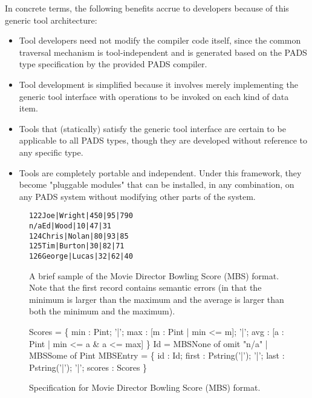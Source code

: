 In concrete terms, the following benefits accrue to developers because of this generic tool architecture:
\begin{itemize}
\item Tool developers need not modify the compiler code itself, since the common traversal mechanism is tool-independent and is generated based on the PADS type specification by the provided PADS compiler.
\item Tool development is simplified because it involves merely implementing the generic tool interface with operations to be invoked on each kind of data item.
\item Tools that (statically) satisfy the generic tool interface are certain to be applicable to all PADS types, though they are developed without reference to any specific type.
\item Tools are completely portable and independent. Under this framework, they become "pluggable modules" that can be installed, in any combination, on any PADS system without modifying other parts of the system.
\end{itemize}

\begin{figure}
  \centering
  \small
\begin{verbatim}
122Joe|Wright|450|95|790
n/aEd|Wood|10|47|31
124Chris|Nolan|80|93|85
125Tim|Burton|30|82|71
126George|Lucas|32|62|40
\end{verbatim}  
  \caption{A brief sample of the Movie Director Bowling Score (MBS) format. Note that the first record contains semantic errors (in that the minimum is larger than the maximum and the average is larger than both the minimum and the maximum).}
  \label{fig:gentool-mbs-sample}
\end{figure}

\begin{figure}
  \centering
  \begin{code}\scriptsize
{} Scores = \{
       min : Pint;
 '|';  max : [m : Pint | min <= m];
 '|';  avg : [a : Pint | min <= a & a <= max]
\}
\mbox{}
 Id =
       MBSNone of omit "n/a"
       | MBSSome of Pint
\mbox{}
 MBSEntry = \{
       id       : Id;
       first    : Pstring('|');
 '|';  last     : Pstring('|');
 '|';  scores   : Scores
\}\end{code}
\caption{Specification for Movie Director Bowling Score (MBS) format.}
\label{fig:gentool-mbs-spec}
\end{figure}

